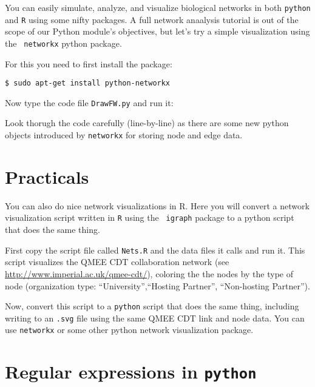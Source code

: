 You can easily simulate, analyze, and visualize biological networks in 
both {\tt python} and {\tt R} using some nifty packages. A full network 
anaalysis tutorial is out of the scope of our Python module's 
objectives, but let's try a simple visualization using the {\tt 
networkx} python package. 

For this you need to first install the package:

\begin{lstlisting}
$ sudo apt-get install python-networkx	
\end{lstlisting}
 
Now type the code file {\tt DrawFW.py} and run it:



Look thorugh the code carefully (line-by-line) as there are some new 
python objects introduced by {\tt networkx} for storing node and edge data.

\section{Practicals}

You can also do nice network visualizations in R. Here you will convert 
a network visualization script written in {\tt R} using the {\tt 
igraph} package to a python script that does the same thing.  

First copy the script file called {\tt Nets.R} and the data files it 
calls and run it. This script visualizes the QMEE CDT collaboration 
network (see \url{http://www.imperial.ac.uk/qmee-cdt/}), coloring the 
the nodes by the type of node (organization type: 
``University'',``Hosting Partner'', ``Non-hosting Partner''). 

Now, convert this script to a {\tt python} script that does the same 
thing, including writing to an {\tt *.svg} file using the same QMEE CDT 
link and node data. You can use {\tt networkx} or some other python 
network visualization package.

\section{Regular expressions in {\tt python}}

